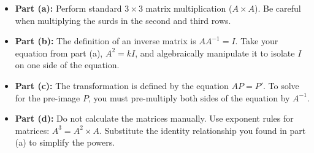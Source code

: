 \begin{hint}
\begin{itemize}
    \item \textbf{Part (a):} Perform standard $3 \times 3$ matrix multiplication ($A \times A$). Be careful when multiplying the surds in the second and third rows.
    \item \textbf{Part (b):} The definition of an inverse matrix is $A A^{-1} = I$. Take your equation from part (a), $A^2 = kI$, and algebraically manipulate it to isolate $I$ on one side of the equation.
    \item \textbf{Part (c):} The transformation is defined by the equation $AP = P'$. To solve for the pre-image $P$, you must pre-multiply both sides of the equation by $A^{-1}$. 
    \item \textbf{Part (d):} Do not calculate the matrices manually. Use exponent rules for matrices: $A^3 = A^2 \times A$. Substitute the identity relationship you found in part (a) to simplify the powers.
\end{itemize}
\end{hint}


